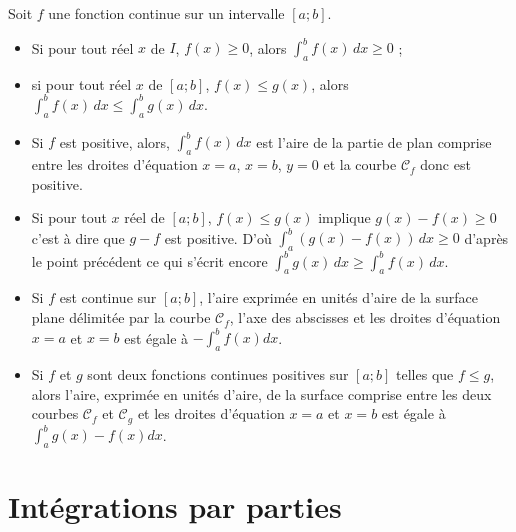 \documentclass[french]{book}
\begin{document}
\begin{prop}
Soit $f$ une fonction continue sur un intervalle $[a;b]$.
\begin{itemize}
 \item[$\bullet$] Si pour tout réel $x$ de $I$, $f(x)\geq 0$, alors $\int_{a}^{b}f(x)\,dx\geq 0$ ;
\item[$\bullet$] si pour tout réel $x$ de $[a;b]$, $f(x)\leq g(x)$, alors $\int_{a}^{b}f(x)\,dx\leq \int_{a}^{b}g(x)\,dx$.
\end{itemize}
\end{prop}

\begin{demo}
\begin{itemize}
\item[$\bullet$] Si $f$ est positive, alors, $\int_{a}^{b}f(x)\,dx$ est l'aire de la partie de plan comprise entre les droites d'équation $x=a$, $x=b$, $y=0$ et la courbe $\mathcal{C}_{f}$ donc est positive.
\item[$\bullet$] Si pour tout $x$ réel de $[a;b]$, $f(x)\leq g(x)$ implique $g(x)-f(x)\geq 0$ c'est à dire que $g-f$ est positive. D'où $\int_{a}^{b}(g(x)-f(x))\,dx\geq 0$ d'après le point précédent ce qui s'écrit encore $\int_{a}^{b}g(x)\,dx\geq\int_{a}^{b}f(x)\,dx$.
\end{itemize}
\end{demo}



\begin{prop}
\begin{itemize}
\item[$\bullet$] Si $f$ est continue sur $[a;b]$, l'aire exprimée en unités d'aire de la surface plane délimitée par la courbe $\mathcal{C}_f$, l'axe des abscisses et les droites d'équation $x=a$ et $x=b$ est égale à $-\int_{a}^{b}f(x)dx$.
\item[$\bullet$] Si $f$ et $g$ sont deux fonctions continues positives sur $[a;b]$ telles que $f\leq g$, alors l'aire, exprimée en unités d'aire, de la surface comprise entre les deux courbes $\mathcal{C}_f$ et $\mathcal{C}_g$ et les droites d'équation $x=a$ et $x=b$ est égale à $\int_{a}^{b}g(x)-f(x)dx$.
\end{itemize}
\end{prop}

\section{Intégrations par parties} 
\end{document}
